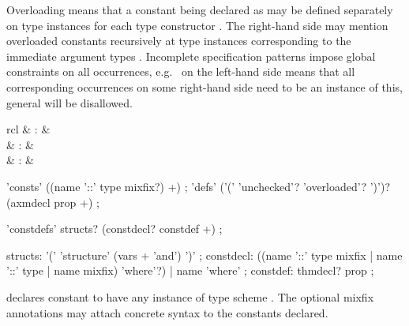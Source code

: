 \begin{isabellebody}
\begin{isamarkuptext}
  Overloading means that a constant being declared as  may be defined separately on type instances  for each type constructor .  The right-hand side may mention overloaded constants
  recursively at type instances corresponding to the immediate
  argument types .  Incomplete
  specification patterns impose global constraints on all occurrences,
  e.g.\  on the left-hand side means that all
  corresponding occurrences on some right-hand side need to be an
  instance of this, general  will be disallowed.

  \begin{matharray}{rcl}
     & : &  \\
     & : &  \\
     & : &  \\
  \end{matharray}

  \begin{rail}
    'consts' ((name '::' type mixfix?) +)
    ;
    'defs' ('(' 'unchecked'? 'overloaded'? ')')? \\ (axmdecl prop +)
    ;
  \end{rail}

  \begin{rail}
    'constdefs' structs? (constdecl? constdef +)
    ;

    structs: '(' 'structure' (vars + 'and') ')'
    ;
    constdecl:  ((name '::' type mixfix | name '::' type | name mixfix) 'where'?) | name 'where'
    ;
    constdef: thmdecl? prop
    ;
  \end{rail}

  \begin{descr}

  \item [\isa{\isacommand{consts}}~\isa{c\ {\isacharcolon}{\isacharcolon}\ {\isasymsigma}}] declares constant
   to have any instance of type scheme \isa{{\isasymsigma}}.  The
  optional mixfix annotations may attach concrete syntax to the
  constants declared.
  

\end{descr}
\end{isamarkuptext}
\end{isabellebody}
